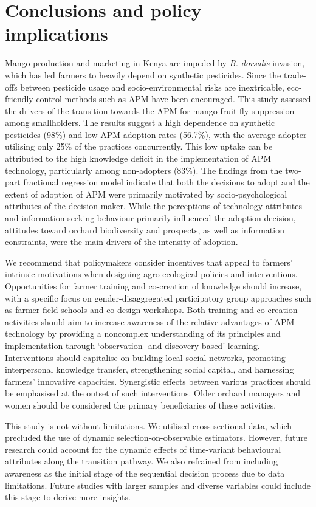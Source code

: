 \documentclass[fleqn,twoside,reqno]{article}
\begin{document}
\section{Conclusions and policy implications}\label{sec:4}
Mango production and marketing in Kenya are impeded by \textit{B. dorsalis} invasion, which has led farmers to heavily depend on synthetic pesticides. Since the trade-offs between pesticide usage and socio-environmental risks are inextricable, eco-friendly control methods such as APM have been encouraged. This study assessed the drivers of the transition towards the APM for mango fruit fly suppression among smallholders. The results suggest a high dependence on synthetic pesticides (98\%) and low APM adoption rates (56.7\%), with the average adopter utilising only 25\% of the practices concurrently. This low uptake can be attributed to the high knowledge deficit in the implementation of APM technology, particularly among non-adopters (83\%). The findings from the two-part fractional regression model indicate that both the decisions to adopt and the extent of adoption of APM were primarily motivated by socio-psychological attributes of the decision maker. While the perceptions of technology attributes and information-seeking behaviour primarily influenced the adoption decision, attitudes toward orchard biodiversity and prospects, as well as information constraints, were the main drivers of the intensity of adoption. 

We recommend that policymakers consider incentives that appeal to farmers’ intrinsic motivations when designing agro-ecological policies and interventions. Opportunities for farmer training and co-creation of knowledge should increase, with a specific focus on gender-disaggregated participatory group approaches such as farmer field schools and co-design workshops. Both training and co-creation activities should aim to increase awareness of the relative advantages of APM technology by providing a noncomplex understanding of its principles and implementation through ‘observation- and discovery-based’ learning. Interventions should capitalise on building local social networks, promoting interpersonal knowledge transfer, strengthening social capital, and harnessing farmers’ innovative capacities. Synergistic effects between various practices should be emphasised at the outset of such interventions. Older orchard managers and women should be considered the primary beneficiaries of these activities.

This study is not without limitations. We utilised cross-sectional data, which precluded the use of dynamic selection-on-observable estimators. However, future research could account for the dynamic effects of time-variant behavioural attributes along the transition pathway. We also refrained from including awareness as the initial stage of the sequential decision process due to data limitations. Future studies with larger samples and diverse variables could include this stage to derive more insights.
\end{document}
